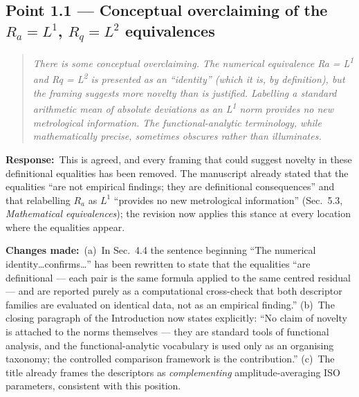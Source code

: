 \documentclass[11pt,a4paper]{article}
\newenvironment{reviewercomment}%
{\par\medskip\noindent\begin{quotation}\itshape\color{black!70}}%
{\end{quotation}\medskip}
\newcommand{\response}{\par\noindent\textbf{Response:}\ }
\newcommand{\changes}{\par\noindent\textbf{Changes made:}\ }
\begin{document}
\subsection*{Point 1.1 --- Conceptual overclaiming of the $R_a = L^1$, $R_q = L^2$ equivalences}
\begin{reviewercomment}
There is some conceptual overclaiming. The numerical equivalence Ra = L\textsuperscript{1} and Rq = L\textsuperscript{2} is presented as an ``identity'' (which it is, by definition), but the framing suggests more novelty than is justified. Labelling a standard arithmetic mean of absolute deviations as an L\textsuperscript{1} norm provides no new metrological information. The functional-analytic terminology, while mathematically precise, sometimes obscures rather than illuminates.
\end{reviewercomment}
\response This is agreed, and every framing that could suggest novelty in these definitional equalities has been removed. The manuscript already stated that the equalities ``are not empirical findings; they are definitional consequences'' and that relabelling $R_a$ as $L^1$ ``provides no new metrological information'' (Sec.~5.3, \emph{Mathematical equivalences}); the revision now applies this stance at every location where the equalities appear.
\changes (a)~In Sec.~4.4 the sentence beginning ``The numerical identity\ldots confirms\ldots'' has been rewritten to state that the equalities ``are definitional --- each pair is the same formula applied to the same centred residual --- and are reported purely as a computational cross-check that both descriptor families are evaluated on identical data, not as an empirical finding.'' (b)~The closing paragraph of the Introduction now states explicitly: ``No claim of novelty is attached to the norms themselves --- they are standard tools of functional analysis, and the functional-analytic vocabulary is used only as an organising taxonomy; the controlled comparison framework is the contribution.'' (c)~The title already frames the descriptors as \emph{complementing} amplitude-averaging ISO parameters, consistent with this position.
\end{document}
